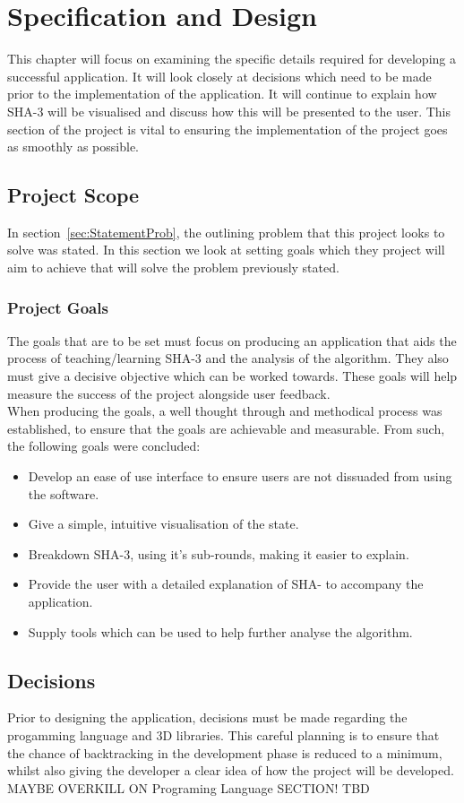 \chapter{Specification and Design}
This chapter will focus on examining the specific details required for developing a successful application. It will look closely at decisions which need to be made prior to the implementation of the application. It will continue to explain how SHA-3 will be visualised and discuss how this will be presented to the user. This section of the project is vital to ensuring the implementation of the project goes as smoothly as possible.
\section{Project Scope}
In section~\ref{sec:StatementProb}, the outlining problem that this project looks to solve was stated. In this section we look at setting goals which they project will aim to achieve that will solve the problem previously stated. 
\subsection{Project Goals}
The goals that are to be set must focus on producing an application that aids the process of teaching/learning SHA-3 and the analysis of the algorithm. They also must give a decisive objective which can be worked towards. These goals will help measure the success of the project alongside user feedback.
\vspace{5 mm}\\
When producing the goals, a well thought through and methodical process was established, to ensure that the goals are achievable and measurable. From such, the following goals were concluded:
\begin{itemize}
\item Develop an ease of use interface to ensure users are not dissuaded from using the software.
\item Give a simple, intuitive visualisation of the state. 
\item Breakdown SHA-3, using it's sub-rounds, making it easier to explain.
\item Provide the user with a detailed explanation of SHA- to accompany the application.
\item Supply tools which can be used to help further analyse the algorithm.
\end{itemize}
\section{Decisions}
Prior to designing the application, decisions must be made regarding the progamming language and 3D libraries. This careful planning is to ensure that the chance of backtracking in the development phase is reduced to a minimum, whilst also giving the developer a clear idea of how the project will be developed.
\vspace{20 mm}\\
MAYBE OVERKILL ON Programing Language SECTION! TBD
